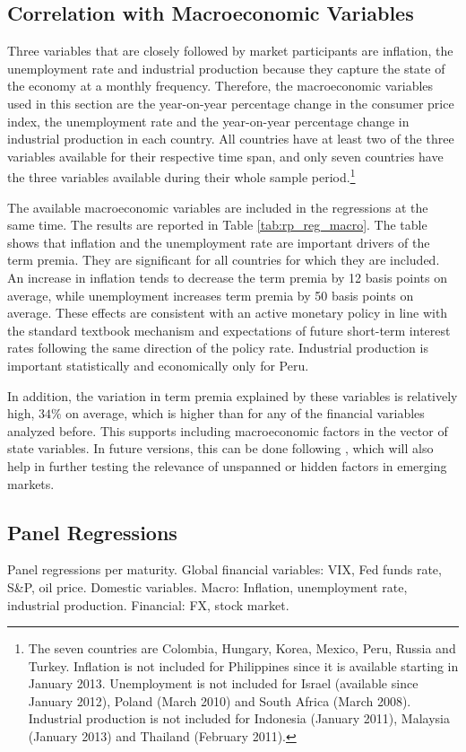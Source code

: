 \subsection{Correlation with Macroeconomic Variables}
Three variables that are closely followed by market participants are inflation, the unemployment rate and industrial production because they capture the state of the economy at a monthly frequency. Therefore, the macroeconomic variables used in this section are the year-on-year percentage change in the consumer price index, the unemployment rate and the year-on-year percentage change in industrial production in each country. All countries have at least two of the three variables available for their respective time span, and only seven countries have the three variables available during their whole sample period.\footnote{The seven countries are Colombia, Hungary, Korea, Mexico, Peru, Russia and Turkey. Inflation is not included for Philippines since it is available starting in January 2013. Unemployment is not included for Israel (available since January 2012), Poland (March 2010) and South Africa (March 2008). Industrial production is not included for Indonesia (January 2011), Malaysia (January 2013) and Thailand (February 2011).} 

The available macroeconomic variables are included in the regressions at the same time. The results are reported in Table \ref{tab:rp_reg_macro}. The table shows that inflation and the unemployment rate are important drivers of the term premia. They are significant for all countries for which they are included. An increase in inflation tends to decrease the term premia by 12 basis points on average, while unemployment increases term premia by 50 basis points on average. These effects are consistent with an active monetary policy in line with the standard textbook mechanism and expectations of future short-term interest rates following the same direction of the policy rate. Industrial production is important statistically and economically only for Peru.

In addition, the variation in term premia explained by these variables is relatively high, $34\%$ on average, which is higher than for any of the financial variables analyzed before. This supports including macroeconomic factors in the vector of state variables. In future versions, this can be done following \citet*{JPS:2014}, which will also help in further testing the relevance of unspanned or hidden factors in emerging markets.

\subsection{Panel Regressions}
Panel regressions per maturity.
Global financial variables: VIX, Fed funds rate, S\&P, oil price.
Domestic variables. Macro: Inflation, unemployment rate, industrial production. Financial: FX, stock market.

